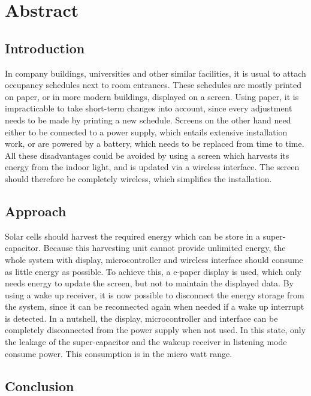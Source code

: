 \chapter*{Abstract}

\section*{Introduction}
In company buildings, universities and other similar facilities, it is usual to attach occupancy schedules next to room entrances.
These schedules are mostly printed on paper, or in more modern buildings, displayed on a screen.
Using paper, it is impracticable to take short-term changes into account, since every adjustment needs to be made by printing a new schedule.
Screens on the other hand need either to be connected to a power supply, which entails extensive installation work, or are powered by a battery, which needs to be replaced from time to time.
All these disadvantages could be avoided by using a screen which harvests its energy from the indoor light, and is updated via a wireless interface.
The screen should therefore be completely wireless, which simplifies the installation.

\section*{Approach}
Solar cells should harvest the required energy which can be store in a super-capacitor.
Because this harvesting unit cannot provide unlimited energy, the whole system with display, microcontroller and wireless interface should consume as little energy as possible.
To achieve this, a e-paper display is used, which only needs energy to update the screen, but not to maintain the displayed data.
By using a wake up receiver, it is now possible to disconnect the energy storage from the system, since it can be reconnected again when needed if a wake up interrupt is detected.
In a nutshell, the display, microcontroller and interface can be completely disconnected from the power supply when not used.
In this state, only the leakage of the super-capacitor and the wakeup receiver in listening mode consume power.
This consumption is in the micro watt range.

\section*{Conclusion}
